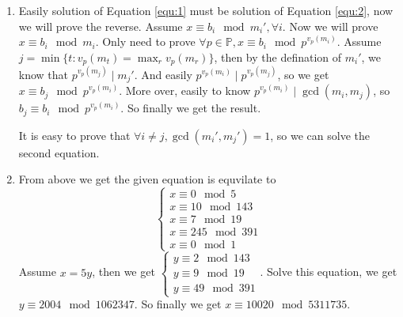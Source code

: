 \documentclass{ctexart}
\begin{document}
\begin{solution}
  \begin{enumerate}
    \item
      Easily solution of Equation \eqref{equ:1} must be solution of Equation \eqref{equ:2}, now we will prove the reverse.
      Assume \(x \equiv b_i \mod m_i',\forall i\). Now we will prove \(x \equiv b_i \mod m_i\).
      Only need to prove \(\forall p \in \mathbb{P},x \equiv b_i \mod p^{v_p(m_i)}\).
      Assume \(j=\min \{t:v_p(m_t)=\max_{r}v_p(m_r)\}\), then by the defination of \(m_i'\), we know that \(p^{v_p(m_j)} \mid m_j'\).
      And easily \(p^{v_p(m_i)} \mid p^{v_p(m_j)}\), so we get \(x \equiv b_j \mod p^{v_p(m_i)}\).
      More over, easily to know \(p^{v_p(m_i)} \mid \gcd(m_i,m_j)\), so \(b_j \equiv b_i \mod p^{v_p(m_i)}\).
      So finally we get the result.

      It is easy to prove that \(\forall i \neq j,\gcd(m_i',m_j')=1\), so we can solve the second equation.
    \item
      From above we get the given equation is equvilate to
      \[
        \begin{cases}
          x \equiv 0 \mod 5     \\
          x \equiv 10 \mod 143  \\
          x \equiv 7 \mod 19    \\
          x \equiv 245 \mod 391 \\
          x \equiv 0 \mod 1
        \end{cases}
      \]
      Assume \(x=5y\), then we get \(\begin{cases}
        y \equiv 2 \mod 143 \\
        y \equiv 9 \mod 19  \\
        y \equiv 49 \mod 391
      \end{cases}\).
      Solve this equation, we get \(y \equiv 2004 \mod 1062347\).
      So finally we get \(x \equiv 10020 \mod 5311735\).
  \end{enumerate}

\end{solution}
\end{document}
